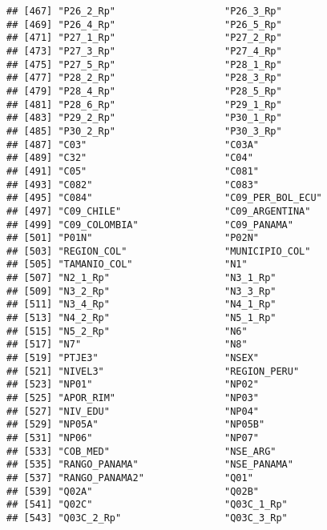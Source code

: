 \documentclass[
]{article}
\begin{document}
\begin{verbatim}
## [467] "P26_2_Rp"                   "P26_3_Rp"                  
## [469] "P26_4_Rp"                   "P26_5_Rp"                  
## [471] "P27_1_Rp"                   "P27_2_Rp"                  
## [473] "P27_3_Rp"                   "P27_4_Rp"                  
## [475] "P27_5_Rp"                   "P28_1_Rp"                  
## [477] "P28_2_Rp"                   "P28_3_Rp"                  
## [479] "P28_4_Rp"                   "P28_5_Rp"                  
## [481] "P28_6_Rp"                   "P29_1_Rp"                  
## [483] "P29_2_Rp"                   "P30_1_Rp"                  
## [485] "P30_2_Rp"                   "P30_3_Rp"                  
## [487] "C03"                        "C03A"                      
## [489] "C32"                        "C04"                       
## [491] "C05"                        "C081"                      
## [493] "C082"                       "C083"                      
## [495] "C084"                       "C09_PER_BOL_ECU"           
## [497] "C09_CHILE"                  "C09_ARGENTINA"             
## [499] "C09_COLOMBIA"               "C09_PANAMA"                
## [501] "P01N"                       "P02N"                      
## [503] "REGION_COL"                 "MUNICIPIO_COL"             
## [505] "TAMANIO_COL"                "N1"                        
## [507] "N2_1_Rp"                    "N3_1_Rp"                   
## [509] "N3_2_Rp"                    "N3_3_Rp"                   
## [511] "N3_4_Rp"                    "N4_1_Rp"                   
## [513] "N4_2_Rp"                    "N5_1_Rp"                   
## [515] "N5_2_Rp"                    "N6"                        
## [517] "N7"                         "N8"                        
## [519] "PTJE3"                      "NSEX"                      
## [521] "NIVEL3"                     "REGION_PERU"               
## [523] "NP01"                       "NP02"                      
## [525] "APOR_RIM"                   "NP03"                      
## [527] "NIV_EDU"                    "NP04"                      
## [529] "NP05A"                      "NP05B"                     
## [531] "NP06"                       "NP07"                      
## [533] "COB_MED"                    "NSE_ARG"                   
## [535] "RANGO_PANAMA"               "NSE_PANAMA"                
## [537] "RANGO_PANAMA2"              "Q01"                       
## [539] "Q02A"                       "Q02B"                      
## [541] "Q02C"                       "Q03C_1_Rp"                 
## [543] "Q03C_2_Rp"                  "Q03C_3_Rp"                 

\end{verbatim}
\end{document}
